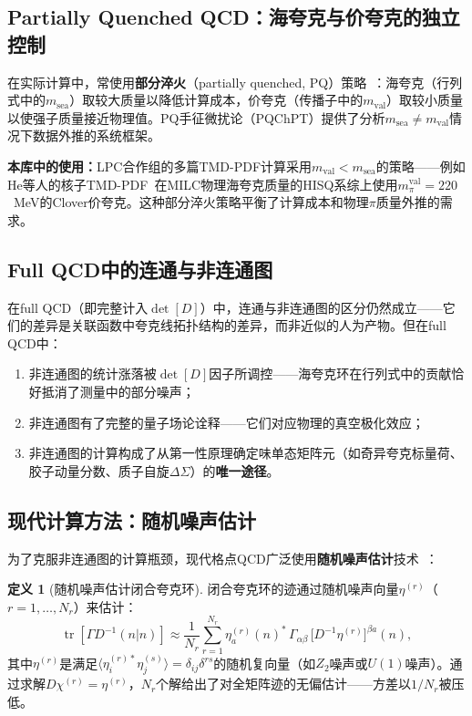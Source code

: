 \documentclass[12pt,a4paper]{ctexart}
\theoremstyle{definition}
\newtheorem{definition}{定义}[section]
\begin{document}
\subsection{Partially Quenched QCD：海夸克与价夸克的独立控制}

在实际计算中，常使用\textbf{部分淬火}（partially quenched, PQ）策略~\cite{GattringerLang2010}：海夸克（行列式中的$m_{\text{sea}}$）取较大质量以降低计算成本，价夸克（传播子中的$m_{\text{val}}$）取较小质量以使强子质量接近物理值。PQ手征微扰论（PQChPT）提供了分析$m_{\text{sea}} \neq m_{\text{val}}$情况下数据外推的系统框架。

\textbf{本库中的使用：}LPC合作组的多篇TMD-PDF计算采用$m_{\text{val}} < m_{\text{sea}}$的策略——例如He等人的核子TMD-PDF~\cite{He2024unpolTMD}在MILC物理海夸克质量的HISQ系综上使用$m_\pi^{\text{val}} = 220$~MeV的Clover价夸克。这种部分淬火策略平衡了计算成本和物理$\pi$质量外推的需求。

\subsection{Full QCD中的连通与非连通图}

在full QCD（即完整计入$\det[D]$）中，连通与非连通图的区分仍然成立——它们的差异是关联函数中夸克线拓扑结构的差异，而非近似的人为产物。但在full QCD中：

\begin{enumerate}[nosep]
    \item 非连通图的统计涨落被$\det[D]$因子所调控——海夸克环在行列式中的贡献恰好抵消了测量中的部分噪声；
    \item 非连通图有了完整的量子场论诠释——它们对应物理的真空极化效应；
    \item 非连通图的计算构成了从第一性原理确定味单态矩阵元（如奇异夸克标量荷、胶子动量分数、质子自旋$\Delta\Sigma$）的\textbf{唯一途径}。
\end{enumerate}

\subsection{现代计算方法：随机噪声估计}

为了克服非连通图的计算瓶颈，现代格点QCD广泛使用\textbf{随机噪声估计}技术~\cite{GattringerLang2010}：

\begin{definition}[随机噪声估计闭合夸克环]
闭合夸克环的迹通过随机噪声向量$\eta^{(r)}$（$r=1,\dots,N_r$）来估计：
\begin{equation}
\operatorname{tr}[\Gamma D^{-1}(n|n)] \approx \frac{1}{N_r}\sum_{r=1}^{N_r} \eta_a^{(r)}(n)^*\, \Gamma_{\alpha\beta}\, \big[D^{-1}\eta^{(r)}\big]^{\beta a}(n),
\label{eq:stochastic_estimation}
\end{equation}
其中$\eta^{(r)}$是满足$\langle \eta_i^{(r)*}\eta_j^{(s)}\rangle = \delta_{ij}\delta^{rs}$的随机复向量（如$Z_2$噪声或$U(1)$噪声）。通过求解$D\chi^{(r)} = \eta^{(r)}$，$N_r$个解给出了对全矩阵迹的无偏估计——方差以$1/N_r$被压低。
\end{definition}
\end{document}
